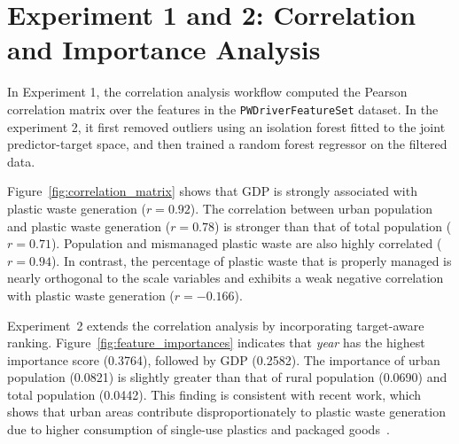 \section{Experiment 1 and 2: Correlation and Importance Analysis}

In Experiment 1, the correlation analysis workflow computed the Pearson correlation matrix over the features in the \texttt{PWDriverFeatureSet} dataset. In the experiment 2, it first removed outliers using an isolation forest fitted to the joint predictor-target space, and then trained a random forest regressor on the filtered data.



Figure~\ref{fig:correlation_matrix} shows that GDP is strongly associated with plastic waste generation (\(r = 0.92\)). The correlation between urban population and plastic waste generation (\(r = 0.78\)) is stronger than that of total population (\(r = 0.71\)). Population and mismanaged plastic waste are also highly correlated (\(r = 0.94\)). In contrast, the percentage of plastic waste that is properly managed is nearly orthogonal to the scale variables and exhibits a weak negative correlation with plastic waste generation (\(r = -0.166\)).



Experiment~2 extends the correlation analysis by incorporating target-aware ranking. Figure~\ref{fig:feature_importances} indicates that \textit{year} has the highest importance score (0.3764), followed by GDP (0.2582). The importance of urban population (0.0821) is slightly greater than that of rural population (0.0690) and total population (0.0442). This finding is consistent with recent work, which shows that urban areas contribute disproportionately to plastic waste generation due to higher consumption of single-use plastics and packaged goods~\cite{sen2026unveiling}.

